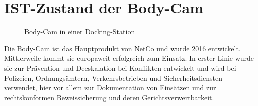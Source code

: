 \documentclass[thesis.tex]{subfiles}
\begin{document}
\section{IST-Zustand der Body-Cam}\label{chap:istZustand}

\begin{figure}[h]
    \centering
    \qquad
    \caption[Body-Cam in einer Docking-Station]{Body-Cam in einer Docking-Station \cite{netco}}
    \label{fig:BC_dock}
\end{figure}

Die Body-Cam ist das Hauptprodukt von NetCo und wurde 2016 entwickelt. Mittlerweile kommt sie europaweit erfolgreich zum Einsatz.
In erster Linie wurde sie zur Prävention und Deeskalation bei Konflikten entwickelt und wird bei Polizeien, Ordnungsämtern, Verkehrsbetrieben und Sicherheitsdiensten verwendet, hier vor allem zur Dokumentation von Einsätzen und zur rechtskonformen Beweissicherung und deren Gerichtsverwertbarkeit.
\end{document}
